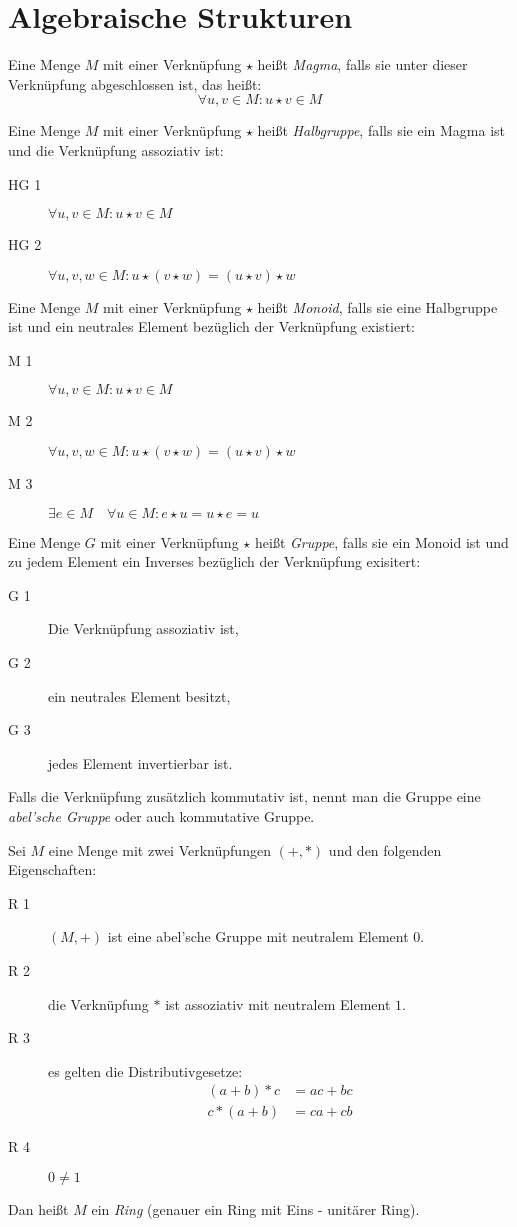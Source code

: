 \chapter{Algebraische Strukturen}
Eine Menge $M$ mit einer Verknüpfung $\star$ heißt \emph{Magma}, falls sie unter dieser Verknüpfung abgeschlossen ist, das heißt:
\begin{equation*}
  \forall u,v \in M: u\star v\in M
\end{equation*}

Eine Menge $M$ mit einer Verknüpfung $\star$ heißt \emph{Halbgruppe}, falls sie ein Magma ist und die Verknüpfung assoziativ ist:
\begin{description}
  \item[HG 1] $\forall u,v \in M: u\star v\in M$
  \item[HG 2] $\forall u,v,w \in M: u\star(v\star w)=(u\star v)\star w$
\end{description}

Eine Menge $M$ mit einer Verknüpfung $\star$ heißt \emph{Monoid}, falls sie eine Halbgruppe ist und ein neutrales Element bezüglich der Verknüpfung existiert:
\begin{description}
  \item[M 1] $\forall u,v \in M: u\star v\in M$
  \item[M 2] $\forall u,v,w \in M: u\star(v\star w)=(u\star v)\star w$
  \item[M 3] $\exists e \in M \quad \forall u\in M: e\star u=u\star e = u$
\end{description}

Eine Menge $G$ mit einer Verknüpfung $\star$ heißt \emph{Gruppe}, falls sie ein Monoid ist und zu jedem Element ein Inverses bezüglich der Verknüpfung exisitert:
\begin{description}
  \item[G 1] Die Verknüpfung assoziativ ist,
  \item[G 2] ein neutrales Element besitzt,
  \item[G 3] jedes Element invertierbar ist.
\end{description}
Falls die Verknüpfung zusätzlich kommutativ ist, nennt man die Gruppe eine \emph{abel'sche Gruppe} oder auch kommutative Gruppe.

Sei $M$ eine Menge mit zwei Verknüpfungen $(+,*)$ und den folgenden Eigenschaften:
\begin{description}
  \item[R 1] $(M,+)$ ist eine abel'sche Gruppe mit neutralem Element $0$.
  \item[R 2] die Verknüpfung $*$ ist assoziativ mit neutralem Element $1$.
  \item[R 3] es gelten die Distributivgesetze:
  \begin{align*}
    (a+b)* c&=ac+bc\\
    c*(a+b)&=ca+cb
  \end{align*}
  \item[R 4] $0\neq 1$
\end{description}
Dan heißt $M$ ein \emph{Ring} (genauer ein Ring mit Eins - unitärer Ring).

